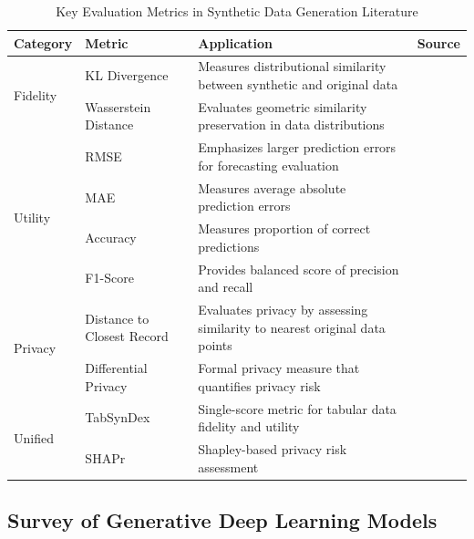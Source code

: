 \documentclass{article}
\begin{document}
\begin{table}[H]
\centering
\caption{Key Evaluation Metrics in Synthetic Data Generation Literature}
\label{tab:literature_metrics_comprehensive}
\small
\begin{tabular}{llp{5cm}l}
\toprule
\textbf{Category} & \textbf{Metric} & \textbf{Application} & \textbf{Source} \\
\midrule
\multirow{2}{*}{Fidelity} 
    & KL Divergence & Measures distributional similarity between synthetic and original data & \textcite{li_his-gan_2019} \\
    & Wasserstein Distance & Evaluates geometric similarity preservation in data distributions & \textcite{li_his-gan_2019} \\
\midrule
\multirow{4}{*}{Utility} 
    & RMSE & Emphasizes larger prediction errors for forecasting evaluation & \textcite{Hazra2022-cy} \\
    & MAE & Measures average absolute prediction errors & \textcite{Hazra2022-cy} \\
    & Accuracy & Measures proportion of correct predictions & \textcite{figueira_survey_2022} \\
    & F1-Score & Provides balanced score of precision and recall & \textcite{figueira_survey_2022} \\
\midrule
\multirow{2}{*}{Privacy} 
    & Distance to Closest Record & Evaluates privacy by assessing similarity to nearest original data points & \textcite{mendelevitch_fidelity_2021} \\
    & Differential Privacy & Formal privacy measure that quantifies privacy risk & \textcite{nikolenko_synthetic_2019} \\
\midrule
\multirow{3}{*}{Unified} 
    & TabSynDex & Single-score metric for tabular data fidelity and utility & \textcite{chundawat_tabsyndex_2024} \\
    & SHAPr & Shapley-based privacy risk assessment & \textcite{duddu_shapr_2022} \\
\bottomrule
\end{tabular}
\end{table}


\subsection{Survey of Generative Deep Learning Models}
\end{document}
